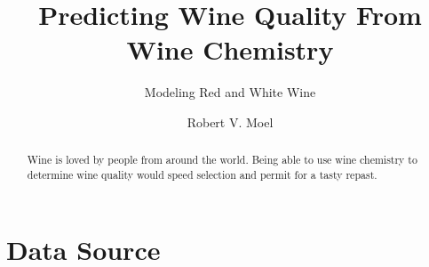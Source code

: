 \documentclass[]{article}
\title{Predicting Wine Quality From Wine Chemistry}
\subtitle{Modeling Red and White Wine}
\author{Robert V. Moel}
\begin{document}
\maketitle
\newpage
\begin{abstract}
Wine is loved by people from around the world.  Being able to use wine chemistry to determine wine quality would speed selection and permit for a tasty repast.
\end{abstract}
\newpage
\section{Data Source}
\end{document}
